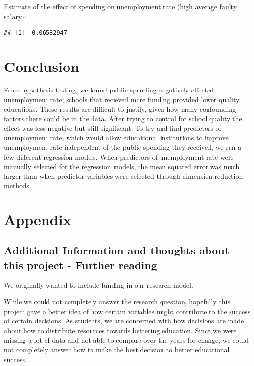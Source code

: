 \documentclass{article}\usepackage[]{graphicx}\usepackage[]{color}
\makeatletter
\newenvironment{kframe}{%
 \def\at@end@of@kframe{}%
 \ifinner\ifhmode%
  \def\at@end@of@kframe{\end{minipage}}%
  \begin{minipage}{\columnwidth}%
 \fi\fi%
 \def\FrameCommand##1{\hskip\@totalleftmargin \hskip-\fboxsep
 \colorbox{shadecolor}{##1}\hskip-\fboxsep
     \hskip-\linewidth \hskip-\@totalleftmargin \hskip\columnwidth}%
 \MakeFramed {\advance\hsize-\width
   \@totalleftmargin\z@ \linewidth\hsize
   \@setminipage}}%
 {\par\unskip\endMakeFramed%
 \at@end@of@kframe}
\newenvironment{knitrout}{}{} %
\makeatother
\begin{document}
Estimate of the effect of spending on unemployment rate (high average faulty salary):
\begin{knitrout}
\color{fgcolor}\begin{kframe}
\begin{verbatim}
## [1] -0.06582947
\end{verbatim}
\end{kframe}
\end{knitrout}
\maketitle
\section{Conclusion}

From hypothesis testing, we found public spending negatively effected unemployment rate; schools that recieved more funding provided lower quality educations. These results are difficult to justify, given how many confounding factors there could be in the data. After trying to control for school quality the effect was less negative but still significant. To try and find predictors of unemployment rate, which would allow educational institutions to improve unemployment rate independent of the public spending they received, we ran a few different regression models. When predictors of unemployment rate were manually selected for the regression models, the mean squared error was much larger than when predictor variables were selected through dimension reduction methods. 

\maketitle
\section{Appendix}

\subsection{Additional Information and thoughts about this project - Further reading}

We originally wanted to include funding in our research model. 

While we could not completely answer the research question, hopefully this project gave a better idea of how certain variables might contribute to the success of certain decisions. As students, we are concerned with how decisions are made about how to distribute resources towards bettering education. Since we were missing a lot of data and not able to compare over the years for change, we could not completely answer how to make the best decision to better educational success. 
\end{document}
